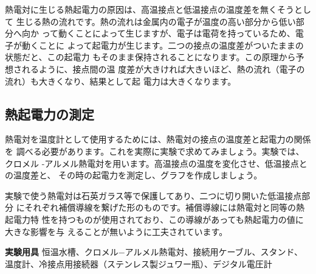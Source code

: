 熱電対に生じる熱起電力の原因は、高温接点と低温接点の温度差を無くそうとして 
生じる熱の流れです。熱の流れは金属内の電子が温度の高い部分から低い部分へ向か 
って動くことによって生じますが、電子は電荷を持っているため、電子が動くことに 
よって起電力が生じます。二つの接点の温度差がついたままの状態だと、この起電力 
もそのまま保持されることになります。この原理から予想されるように、接点間の温
度差が大きければ大きいほど、熱の流れ（電子の流れ）も大きくなり、結果として起 
電力は大きくなります。


\subsection{熱起電力の測定}

熱電対を温度計として使用するためには、熱電対の接点の温度差と起電力の関係を 
調べる必要があります。これを実際に実験で求めてみましょう。実験では、クロメル 
-アルメル熱電対を用います。高温接点の温度を変化させ、低温接点との温度差と、 
その時の起電力を測定し、グラフを作成しましょう。

実験で使う熱電対は石英ガラス等で保護してあり、二つに切り開いた低温接点部分 
にそれぞれ補償導線を繋げた形のものです。補償導線には熱電対と同等の熱起電力特 
性を持つものが使用されており、この導線があっても熱起電力の値に大きな影響を与 
えることが無いように工夫されています。

\newpage

\jikken

\begin{itemsquarebox}[c]{\bf 実験用具}
恒温水槽、クロメル−アルメル熱電対、接続用ケーブル、スタンド、
温度計、冷接点用接続器（ステンレス製ジュワー瓶）、デジタル電圧計
\end{itemsquarebox}

\bigskip


